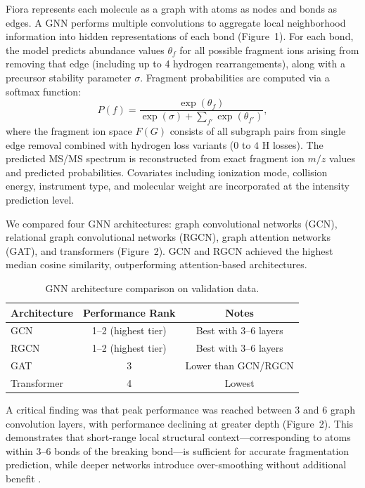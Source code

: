 \documentclass[11pt]{article}
\begin{document}
Fiora represents each molecule as a graph with atoms as nodes and bonds as edges. A GNN performs multiple convolutions to aggregate local neighborhood information into hidden representations of each bond (Figure~1). For each bond, the model predicts abundance values $\theta_f$ for all possible fragment ions arising from removing that edge (including up to 4 hydrogen rearrangements), along with a precursor stability parameter $\sigma$. Fragment probabilities are computed via a softmax function:
\begin{equation}
P(f) = \frac{\exp(\theta_f)}{\exp(\sigma) + \sum_{f'} \exp(\theta_{f'})},
\end{equation}
where the fragment ion space $F(G)$ consists of all subgraph pairs from single edge removal combined with hydrogen loss variants ($0$ to $4$ H losses). The predicted MS/MS spectrum is reconstructed from exact fragment ion $m/z$ values and predicted probabilities. Covariates including ionization mode, collision energy, instrument type, and molecular weight are incorporated at the intensity prediction level.

We compared four GNN architectures: graph convolutional networks (GCN), relational graph convolutional networks (RGCN), graph attention networks (GAT), and transformers (Figure~2). GCN and RGCN achieved the highest median cosine similarity, outperforming attention-based architectures.

\begin{table}[H]
\centering
\caption{GNN architecture comparison on validation data.}
\label{tab:architecture}
\begin{tabular}{lcc}
\toprule
Architecture & Performance Rank & Notes \\
\midrule
GCN & 1--2 (highest tier) & Best with 3--6 layers \\
RGCN & 1--2 (highest tier) & Best with 3--6 layers \\
GAT & 3 & Lower than GCN/RGCN \\
Transformer & 4 & Lowest \\
\bottomrule
\end{tabular}
\end{table}

A critical finding was that peak performance was reached between 3 and 6 graph convolution layers, with performance declining at greater depth (Figure~2). This demonstrates that short-range local structural context---corresponding to atoms within 3--6 bonds of the breaking bond---is sufficient for accurate fragmentation prediction, while deeper networks introduce over-smoothing without additional benefit \citep{Li2018,Kipf2017}.
\end{document}
